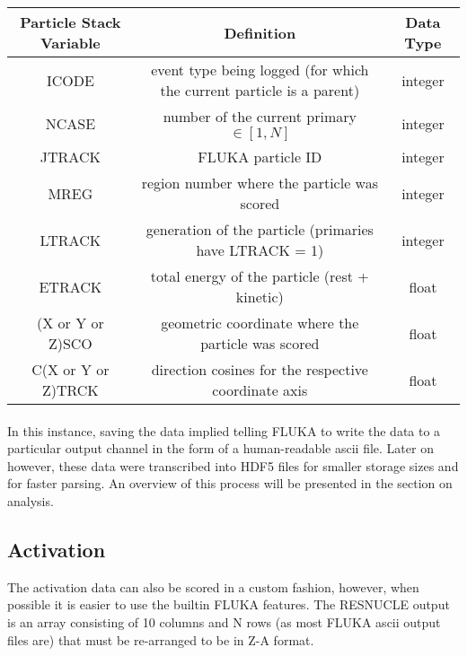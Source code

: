\begin{center}
    \label{tab:mgdraw_vars}
\begin{tabular}[h]{|c|c|c|}
    \hline
    \textbf{Particle Stack Variable} & \textbf{Definition} & \textbf{Data Type}\\
    \hline
    \hline
    ICODE & event type being logged (for which the current particle is a parent) & integer \\
    NCASE & number of the current primary $\in [1,N]$ & integer\\
    JTRACK & FLUKA particle ID & integer \\
    MREG & region number where the particle was scored & integer \\
    LTRACK & generation of the particle (primaries have LTRACK = 1) & integer \\
    ETRACK & total energy of the particle (rest + kinetic) & float \\
    (X or Y or Z)SCO & geometric coordinate where the particle was scored & float \\
    C(X or Y or Z)TRCK & direction cosines for the respective coordinate axis & float \\
    \hline

\end{tabular}
\end{center}

\normalsize

\paragraph{}
In this instance, saving the data implied telling FLUKA to write the data to a particular output channel in the form of a human-readable ascii file. Later on however, these data were transcribed into HDF5 files for smaller storage sizes and for faster parsing. An overview of this process will be presented in the section on analysis.

\subsection{Activation}
The activation data can also be scored in a custom fashion, however, when possible it is easier to use the builtin FLUKA features. The RESNUCLE output is an array consisting of 10 columns and N rows (as most FLUKA ascii output files are) that must be re-arranged to be in Z-A format. 